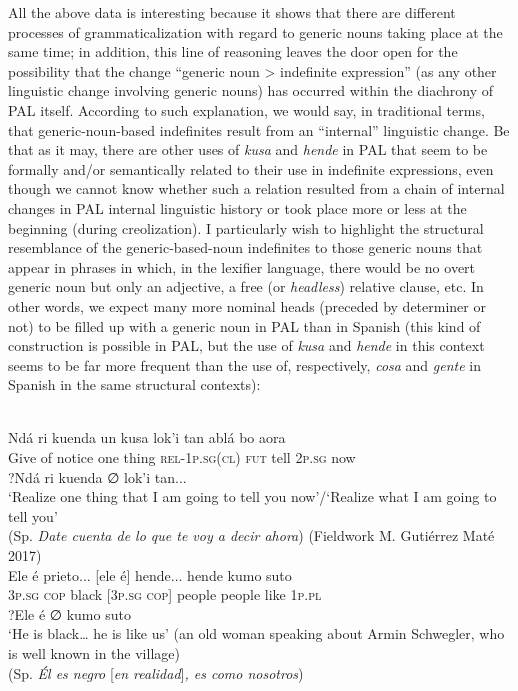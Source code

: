 \documentclass[output=paper,colorlinks,citecolor=brown]{langscibook}
\begin{document}
All the above data is interesting because it shows that there are different processes of grammaticalization with regard to generic nouns taking place at the same time; in addition, this line of reasoning leaves the door open for the possibility that the change “generic noun > indefinite expression” (as any other linguistic change involving generic nouns) has occurred within the diachrony of PAL itself. According to such explanation, we would say, in traditional terms, that generic-noun-based indefinites result from an “internal” linguistic change. Be that as it may, there are other uses of \textit{kusa} and \textit{hende} in PAL that seem to be formally and/or semantically related to their use in indefinite expressions, even though we cannot know whether such a relation resulted from a chain of internal changes in PAL internal linguistic history or took place more or less at the beginning (during creolization). I particularly wish to highlight the structural resemblance of the generic-based-noun indefinites to those generic nouns that appear in phrases in which, in the lexifier language, there would be no overt generic noun but only an adjective, a free (or \textit{headless}) relative clause, etc. In other words, we expect many more nominal heads (preceded by determiner or not) to be filled up with a generic noun in PAL than in Spanish (this kind of construction is possible in PAL, but the use of \textit{kusa} and \textit{hende} in this context seems to be far more frequent than the use of, respectively, \textit{cosa} and \textit{gente} in Spanish in the same structural contexts):\largerpage[-1]

\ea\label{ex:gut21}\citep[247]{MagliaMoñino2015}\\
\gll Ndá ri kuenda un kusa lok’i tan ablá bo aora \\
Give of notice one thing \textsc{rel}-1\textsc{p.sg(cl)} \textsc{fut} tell 2\textsc{p.sg} now \\
\newline ?Ndá ri kuenda ∅ lok’i tan... \\
\glt‘Realize one thing that I am going to tell you now’\slash ‘Realize what I am going to tell you’ \\
(Sp. \textit{Date cuenta de lo que te voy a decir ahora})
\pagebreak
\ex\label{ex:gut22}(Fieldwork M. Gutiérrez Maté 2017)\\
\gll Ele é prieto... [ele é] hende... hende kumo suto \\
3\textsc{p.sg} \textsc{cop} black [3\textsc{p.sg} \textsc{cop}] people people like 1\textsc{p.pl} \\
\newline ?Ele é ∅ kumo suto \\
\glt ‘He is black… he is like us’ (an old woman speaking about Armin Schwegler, who is well known in the village) \\
(Sp. \textit{Él es negro} [\textit{en realidad}]\textit{, es como nosotros})
\z
\end{document}
